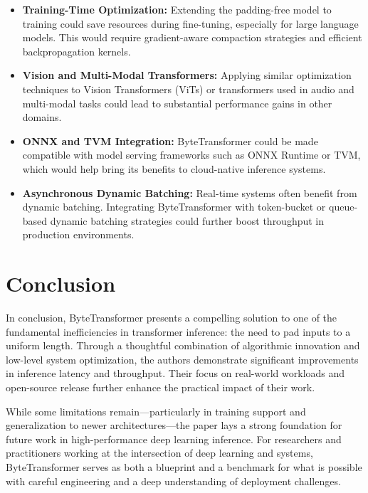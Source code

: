 \documentclass[11pt]{article}
\begin{document}
\begin{itemize}
    \item \textbf{Training-Time Optimization:} Extending the padding-free model to training could save resources during fine-tuning, especially for large language models. This would require gradient-aware compaction strategies and efficient backpropagation kernels.
    
    \item \textbf{Vision and Multi-Modal Transformers:} Applying similar optimization techniques to Vision Transformers (ViTs) or transformers used in audio and multi-modal tasks could lead to substantial performance gains in other domains.
    
    \item \textbf{ONNX and TVM Integration:} ByteTransformer could be made compatible with model serving frameworks such as ONNX Runtime or TVM, which would help bring its benefits to cloud-native inference systems.
    
    \item \textbf{Asynchronous Dynamic Batching:} Real-time systems often benefit from dynamic batching. Integrating ByteTransformer with token-bucket or queue-based dynamic batching strategies could further boost throughput in production environments.
\end{itemize}

\section{Conclusion}

In conclusion, ByteTransformer presents a compelling solution to one of the fundamental inefficiencies in transformer inference: the need to pad inputs to a uniform length. Through a thoughtful combination of algorithmic innovation and low-level system optimization, the authors demonstrate significant improvements in inference latency and throughput. Their focus on real-world workloads and open-source release further enhance the practical impact of their work.

While some limitations remain—particularly in training support and generalization to newer architectures—the paper lays a strong foundation for future work in high-performance deep learning inference. For researchers and practitioners working at the intersection of deep learning and systems, ByteTransformer serves as both a blueprint and a benchmark for what is possible with careful engineering and a deep understanding of deployment challenges.
\end{document}
